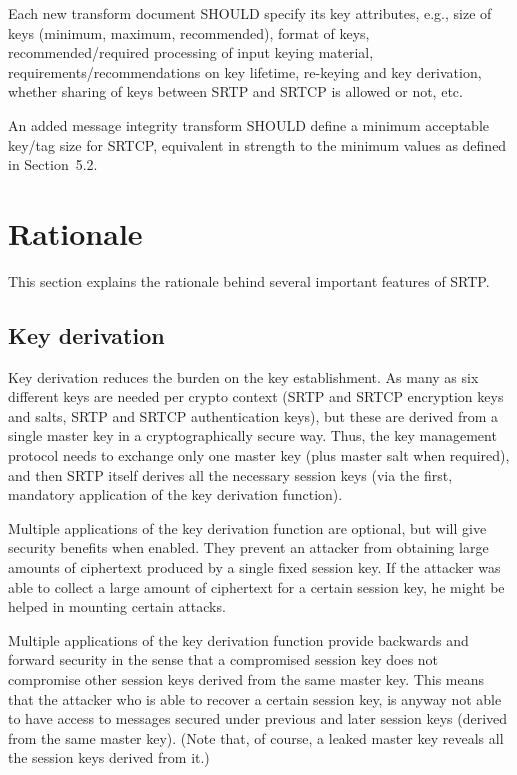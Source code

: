 \documentclass{article}
\begin{document}
Each new transform document SHOULD specify its key attributes, e.g., size of keys (minimum, maximum, recommended), format of keys, recommended/required processing of input keying material, requirements/recommendations on key lifetime, re-keying and key derivation, whether sharing of keys between SRTP and SRTCP is allowed or not, etc.

An added message integrity transform SHOULD define a minimum acceptable key/tag size for SRTCP, equivalent in strength to the minimum values as defined in Section~5.2.

\section{Rationale}

This section explains the rationale behind several important features of SRTP.

\subsection{Key derivation}

Key derivation reduces the burden on the key establishment.  As many as six different keys are needed per crypto context (SRTP and SRTCP encryption keys and salts, SRTP and SRTCP authentication keys), but these are derived from a single master key in a cryptographically secure way.  Thus, the key management protocol needs to exchange only one master key (plus master salt when required), and then SRTP itself derives all the necessary session keys (via the first, mandatory application of the key derivation function).

Multiple applications of the key derivation function are optional, but will give security benefits when enabled.  They prevent an attacker from obtaining large amounts of ciphertext produced by a single fixed session key.  If the attacker was able to collect a large amount of ciphertext for a certain session key, he might be helped in mounting certain attacks.

Multiple applications of the key derivation function provide backwards and forward security in the sense that a compromised session key does not compromise other session keys derived from the same master key.  This means that the attacker who is able to recover a certain session key, is anyway not able to have access to messages secured under previous and later session keys (derived from the same master key).  (Note that, of course, a leaked master key reveals all the session keys derived from it.)
\end{document}
